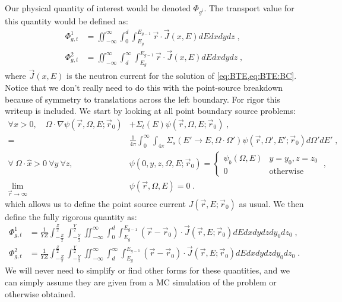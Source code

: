 \documentclass[a4paper,letterpaper,12pt,oneside,draft]{article}
\newcommand{\eec}{\;,}
\newcommand{\eep}{\;.}
\newcommand{\intg}[2][g]{\ensuremath{\int_{E_{#1}}^{E_{#1-1}} #2 dE}}
\newcommand{\vr}{\ensuremath{\vec{r}}}
\newcommand{\dvr}{\left(\vr-\vr_0\right)}
\newcommand{\psifz}[1][]{\psi(\vr,\Omega#1,E#1;\vr_0)}
\begin{document}
    Our physical quantity of interest would be denoted $\Phi_{g^i}$. The transport value for this quantity would be defined as:
    \begin{align}
        \label{eq:Phi1:Transport}
        \Phi_{g,t}^1 &= \iint_{-\infty}^{\infty}\int_{0}^{d}\intg{\vr\cdot \vec{J}(x,E)}dxdydz \eec \\\nonumber
        \Phi_{g,t}^2 &= \iint_{-\infty}^{\infty}\int_{d}^{\infty}\intg{\vr\cdot \vec{J}(x,E)}dxdydz \eec
    \end{align}
    where $\vec{J}(x,E)$ is the neutron current for the solution of \cref{eq:BTE,eq:BTE:BC}.
    Notice that we don't really need to do this with the point-source breakdown because of symmetry to translations across the left boundary.
    For rigor this writeup is included.
    We start by looking at all point boundary source problems:
    \begin{align}
    \nonumber
    \forall x>0,\quad \Omega\cdot\nabla\psifz &+ \Sigma_t(E)\psifz \eec \\ 
    \label{eq:BTE:PS}
    =& \frac{1}{4\pi}\int_0^\infty\int_{4\pi}\Sigma_{s}(E'\to E,\Omega\cdot\Omega')\psifz[']d\Omega'dE' \eec\\
    \label{eq:BTE:PS:BC}
    \forall\  \Omega\cdot\hat{x}>0\  \forall y\  \forall z, \quad &
    \psi(0,y,z,\Omega,E;\vr_0) = \begin{cases}
    \psi_b(\Omega,E) & y=y_0, z=z_0 \\ 0 & \text{otherwise}
    \end{cases}\eec \\\nonumber
    \lim\limits_{\vr\to\infty}&\psi(\vr,\Omega,E) = 0 \eep
    \end{align}
    which allows us to define the point source current $J(\vr,E;\vr_0)$ as usual. We then define the fully rigorous quantity as:
    \begin{align}
    \label{eq:Phi1:Transport:Full}
        \Phi_{g,t}^1 &= \frac{1}{YZ} \int_{-\frac{Z}{2}}^{\frac{Z}{2}} \int_{-\frac{Y}{2}}^{\frac{Y}{2}} \iint_{-\infty}^{\infty} \int_{0}^{d} \intg{\dvr\cdot \vec{J}(\vr,E;\vr_0)}dxdydzdy_0dz_0 \eec \\\nonumber
        \Phi_{g,t}^2 &= \frac{1}{YZ} \int_{-\frac{Z}{2}}^{\frac{Z}{2}} \int_{-\frac{Y}{2}}^{\frac{Y}{2}} \iint_{-\infty}^{\infty} \int_{d}^{\infty} \intg{\dvr\cdot \vec{J}(\vr,E;\vr_0)}dxdydzdy_0dz_0 \eep
    \end{align}
    We will never need to simplify or find other forms for these quantities, and we can simply assume they are given from a MC simulation of the problem or otherwise obtained.
    
\end{document}
